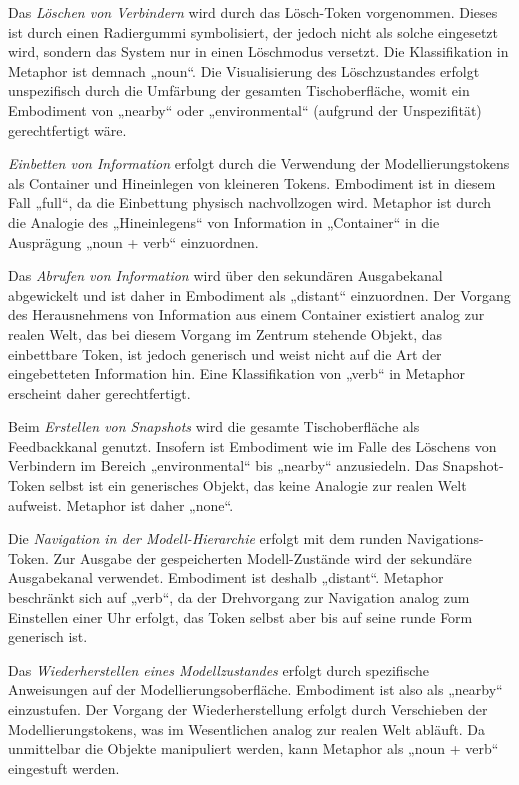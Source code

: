 Das \emph{Löschen von Verbindern} wird durch das Lösch-Token vorgenommen. Dieses ist durch einen Radiergummi symbolisiert, der jedoch nicht als solche eingesetzt wird, sondern das System nur in einen Löschmodus versetzt. Die Klassifikation in Metaphor ist demnach „noun“. Die Visualisierung des Löschzustandes erfolgt unspezifisch durch die Umfärbung der gesamten Tischoberfläche, womit ein Embodiment von „nearby“ oder „environmental“ (aufgrund der Unspezifität) gerechtfertigt wäre.

\emph{Einbetten von Information} erfolgt durch die Verwendung der Modellierungstokens als Container und Hineinlegen von kleineren Tokens. Embodiment ist in diesem Fall „full“, da die Einbettung physisch nachvollzogen wird. Metaphor ist durch die Analogie des „Hineinlegens“ von Information in „Container“ in die Ausprägung „noun + verb“ einzuordnen.

Das \emph{Abrufen von Information} wird über den sekundären Ausgabekanal abgewickelt und ist daher in Embodiment als „distant“ einzuordnen. Der Vorgang des Herausnehmens von Information aus einem Container existiert analog zur realen Welt, das bei diesem Vorgang im Zentrum stehende Objekt, das einbettbare Token, ist jedoch generisch und weist nicht auf die Art der eingebetteten Information hin. Eine Klassifikation von „verb“ in Metaphor erscheint daher gerechtfertigt.

Beim \emph{Erstellen von Snapshots} wird die gesamte Tischoberfläche als Feedbackkanal genutzt. Insofern ist Embodiment wie im Falle des Löschens von Verbindern im Bereich „environmental“ bis „nearby“ anzusiedeln. Das Snapshot-Token selbst ist ein generisches Objekt, das keine Analogie zur realen Welt aufweist. Metaphor ist daher „none“.

Die \emph{Navigation in der Modell-Hierarchie} erfolgt mit dem runden Navigations-Token. Zur Ausgabe der gespeicherten Modell-Zustände wird der sekundäre Ausgabekanal
verwendet. Embodiment ist deshalb „distant“. Metaphor beschränkt sich auf „verb“, da der Drehvorgang zur Navigation analog zum Einstellen einer Uhr erfolgt, das Token selbst aber bis auf seine runde Form generisch ist.

Das \emph{Wiederherstellen eines Modellzustandes} erfolgt durch spezifische Anweisungen auf der Modellierungsoberfläche. Embodiment ist also als „nearby“ einzustufen. Der Vorgang der Wiederherstellung erfolgt durch Verschieben der Modellierungstokens, was im Wesentlichen analog zur realen Welt abläuft. Da unmittelbar die Objekte manipuliert werden, kann Metaphor als „noun + verb“ eingestuft werden.

